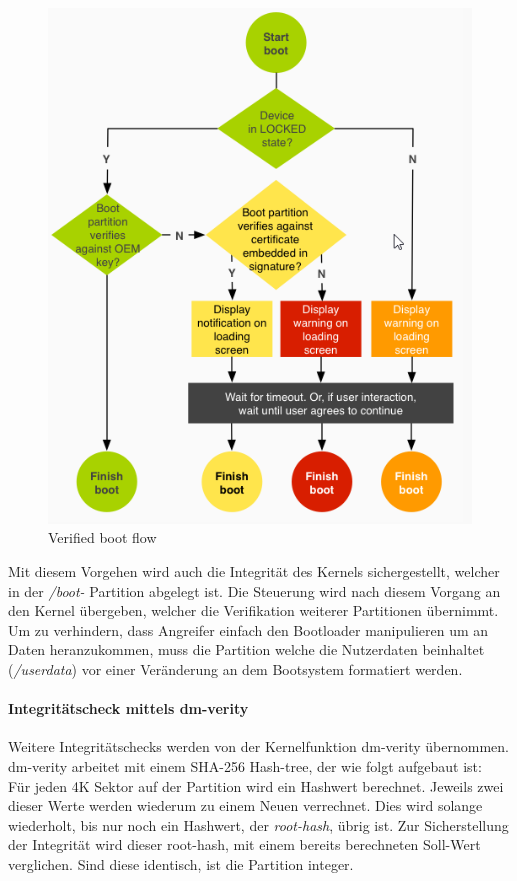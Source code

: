 	\begin{figure}[h]
		\centering
		\includegraphics[width=0.7\linewidth, height=0.5\textheight]{android_pages/graphics/VerifiedBoot}
		\caption[Verified boot flow\protect\cite{VerifyingBoot}]{Verified boot flow\protect\cite{VerifyingBoot}}
		\label{fig:VerifiedBoot}
	\end{figure}
	
\begin{flushleft}
	Mit diesem Vorgehen wird auch die Integrität des Kernels sichergestellt, welcher in der \textit{/boot-} Partition abgelegt ist. Die Steuerung wird nach diesem Vorgang an den Kernel übergeben, welcher die Verifikation weiterer Partitionen übernimmt.\newline\\

	Um zu verhindern, dass Angreifer einfach den Bootloader manipulieren um an Daten heranzukommen, muss die Partition welche die Nutzerdaten beinhaltet (\textit{/userdata}) vor einer Veränderung an dem Bootsystem formatiert werden.
\end{flushleft}
	
	\paragraph{Integritätscheck mittels dm-verity}
	Weitere Integritätschecks werden von der Kernelfunktion dm-verity übernommen.
	dm-verity arbeitet mit einem SHA-256 Hash-tree, der wie folgt aufgebaut ist:\\
	Für jeden 4K Sektor auf der Partition wird ein Hashwert berechnet. Jeweils zwei dieser Werte werden wiederum zu einem Neuen verrechnet. Dies wird solange wiederholt, bis nur noch ein Hashwert, der \textit{root-hash}, übrig ist. Zur Sicherstellung der Integrität wird dieser root-hash, mit einem bereits berechneten Soll-Wert verglichen. Sind diese identisch, ist die Partition integer.
	
